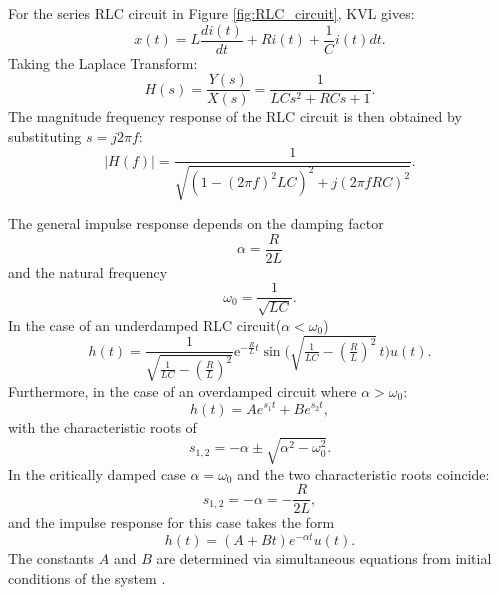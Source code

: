 \documentclass[a4paper, onecolumn, 12pt]{IEEEtran}
\begin{document}
For the series RLC circuit in Figure \ref{fig:RLC_circuit}, KVL gives:
\begin{equation}
  \label{eqn:rlc_kvl_raw}
  x(t) = L\frac{di(t)}{dt} +  Ri(t) + \frac{1}{C}i(t)dt.
\end{equation}
Taking the Laplace Transform:
\begin{equation}
  H(s) = \frac{Y(s)}{X(s)} = \frac{1}{LCs^2 + RCs + 1}.
\end{equation}
The magnitude frequency response of the RLC circuit is then obtained by substituting $s = j 2 \pi f$:
\begin{equation}
  \label{eqn:rlc_Hf_general}
  |H(f)| = \frac{1}{\sqrt{ \left( 1 - (2 \pi f)^2 LC \right)^2 + j(2 \pi f RC)^2 }}.
\end{equation}

The general impulse response depends on the damping factor \cite{ebn}
\begin{equation}\label{alpha}
  \alpha = \frac{R}{2L}
\end{equation}
and the natural frequency 
\begin{equation} \label{omega_0}
\omega_0 = \frac{1}{\sqrt{LC}}.
\end{equation}
In the case of an underdamped RLC circuit($\alpha < \omega_0$)
\begin{equation} 
  \label{eqn:rlc_ht_general}
  h(t) = \frac{1}{\sqrt{\tfrac{1}{LC} - \left(\tfrac{R}{L}\right)^2}} \mathrm{e}^{-\tfrac{R}{L} t} \sin\!\Bigg(\sqrt{\tfrac{1}{LC} - \left(\tfrac{R}{L}\right)^2} \, t\Bigg) u(t).
\end{equation}
Furthermore, in the case of an overdamped circuit where $\alpha > \omega_0$:
\begin{equation}
  \label{eqn:rlc_ht_overdamped}
  h(t) = A e^{s_1 t} + B e^{s_2 t},
\end{equation}
with the characteristic roots of
\begin{equation}
  \label{char_roots}
  s_{1,2} = -\alpha \pm \sqrt{\alpha^2 - \omega_0^2}.
\end{equation}
In the critically damped case $\alpha = \omega_0$ and the two characteristic roots coincide:
\begin{equation}
  s_{1,2} = -\alpha = -\frac{R}{2L},
\end{equation}
and the impulse response for this case takes the form
\begin{equation} 
  \label{eqn:rlc_ht_critdamped}
  h(t) = (A + Bt) e^{-\alpha t} u(t).
\end{equation}
The constants $A$ and $B$ are determined via simultaneous equations from initial conditions of the system \cite{ebn}.
\end{document}
